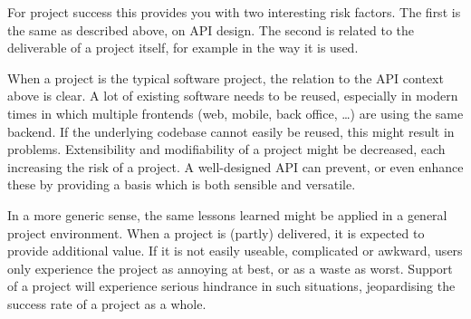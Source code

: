 \documentclass[]{uva-bachelor-thesis}
\def \CurrChapter {}
\def \CurrSection {}
\renewcommand{\chaptermark}[1]{\def \CurrChapter {#1} \def \CurrSection {}}
\begin{document}
For project success this provides you with two interesting risk factors. 
The first is the same as described above, on API design.
The second is related to the deliverable of a project itself, for example in the way it is used.

When a project is the typical software project, the relation to the API context above is clear. 
A lot of existing software needs to be reused, especially in modern times in which multiple frontends (web, mobile, back office, \ldots) are using the same backend. 
If the underlying codebase cannot easily be reused, this might result in problems. 
Extensibility and modifiability of a project might be decreased, each increasing the risk of a project. 
A well-designed API can prevent, or even enhance these by providing a basis which is both sensible and versatile.

In a more generic sense, the same lessons learned might be applied in a general project environment.
When a project is (partly) delivered, it is expected to provide additional value.
If it is not easily useable, complicated or awkward, users only experience the project as annoying at best, or as a waste as worst.
Support of a project will experience serious hindrance in such situations, jeopardising the success rate of a project as a whole.



\chaptermark{Bibliography}
\end{document}
